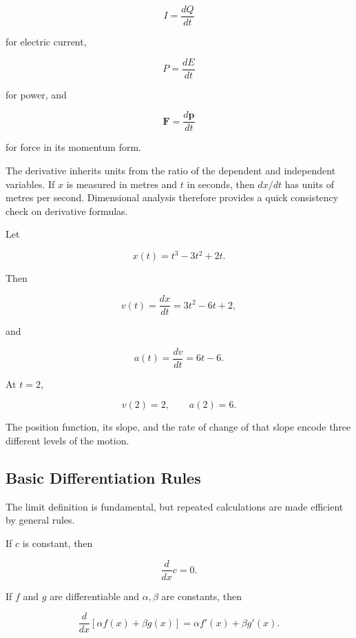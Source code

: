 \[
I=\frac{dQ}{dt}
\]

for electric current,

\[
P=\frac{dE}{dt}
\]

for power, and

\[
\mathbf F=\frac{d\mathbf p}{dt}
\]

for force in its momentum form.

\begin{bookinsight}
The derivative inherits units from the ratio of the dependent and independent variables. If $x$ is measured in metres and $t$ in seconds, then $dx/dt$ has units of metres per second. Dimensional analysis therefore provides a quick consistency check on derivative formulas.
\end{bookinsight}

\begin{bookexample}
Let

\[
x(t)=t^3-3t^2+2t.
\]

Then

\[
v(t)=\frac{dx}{dt}=3t^2-6t+2,
\]

and

\[
a(t)=\frac{dv}{dt}=6t-6.
\]

At $t=2$,

\[
v(2)=2,
\qquad
a(2)=6.
\]

The position function, its slope, and the rate of change of that slope encode three different levels of the motion.
\end{bookexample}

\subsection{Basic Differentiation Rules}

The limit definition is fundamental, but repeated calculations are made efficient by general rules.


If $c$ is constant, then

\[
\boxed{\frac{d}{dx}c=0.}
\]

If $f$ and $g$ are differentiable and $\alpha,\beta$ are constants, then

\begin{equation}
\boxed{
\frac{d}{dx}[\alpha f(x)+\beta g(x)]
=
\alpha f'(x)+\beta g'(x).
}
\label{eq:linearity-derivative}
\end{equation}


